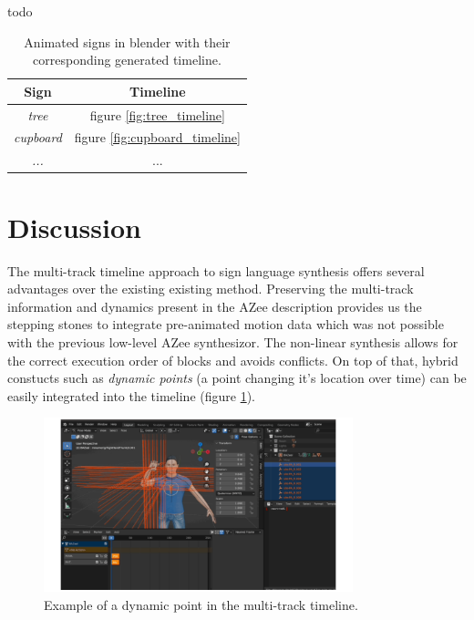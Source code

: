 \documentclass[../../main.tex]{subfiles}
\begin{document}
todo
\begin{table}[h]
    \centering
    \begin{tabular}{|c|c|}
        \hline
        \textbf{Sign} & \textbf{Timeline} \\
        \hline
        \emph{tree} & figure \ref{fig:tree_timeline} \\
        \emph{cupboard} & figure \ref{fig:cupboard_timeline} \\
        \emph{...} & ... \\
        \hline
    \end{tabular}
    \caption{Animated signs in blender with their corresponding generated timeline.}
    \label{tab:azee_to_blender}
\end{table}

\section{Discussion}
\label{ch:multi_track:discussion}

The multi-track timeline approach to sign language synthesis offers several advantages over the existing existing method. Preserving the multi-track information and dynamics present in the AZee description provides us the stepping stones to integrate pre-animated motion data which was not possible with the previous low-level AZee synthesizor. The non-linear synthesis allows for the correct execution order of blocks and avoids conflicts. On top of that, hybrid constucts such as \emph{dynamic points} (a point changing it's location over time) can be easily integrated into the timeline (figure \ref{fig:dynpoint_example}).

\begin{figure}[h]
    \centering
    \includegraphics[width=0.8\textwidth]{chapters/multi_track/images/dynpoint_example.png}
    \caption{Example of a dynamic point in the multi-track timeline.}
    \label{fig:dynpoint_example}
\end{figure}
\end{document}
